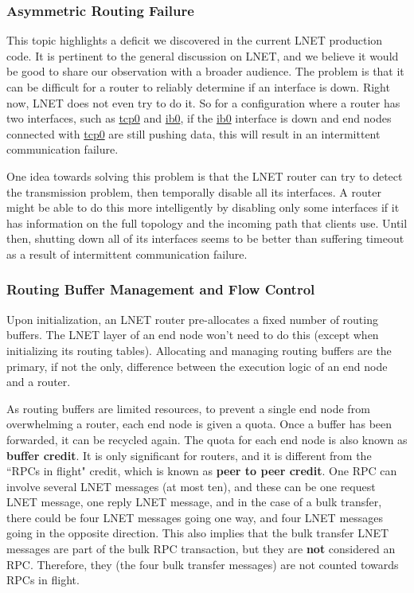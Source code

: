 \subsubsection{Asymmetric Routing Failure}

This topic highlights a deficit we discovered in the current LNET production code. It is
pertinent to the general discussion on LNET, and
we believe it would be good to share our observation with a broader audience. The problem is
that it can be difficult for a router to reliably determine if an interface is
down. Right now, LNET does not even try to do it. So for a configuration
where a router has two interfaces, such as \url{tcp0} and \url{ib0}, if the \url{ib0}
interface is down and end nodes connected with \url{tcp0} are still pushing
data, this will result in an intermittent communication failure.

One idea towards solving this problem is that the  LNET router can try to
detect the transmission problem, then temporally disable all its interfaces. A
router might be able to do this more intelligently by disabling only some
interfaces if it has information on the full topology and the incoming path
that clients use. Until then, shutting down all of its interfaces seems to be
better than suffering timeout as a result of intermittent communication
failure.

\subsubsection{Routing Buffer Management and Flow Control}

Upon initialization, an LNET router pre-allocates a fixed number of routing
buffers. The LNET layer of an end node won't need to do this (except when
initializing its routing tables). Allocating and managing routing buffers are
the primary, if not the only, difference between the execution logic of an end
node and a router.

As routing buffers are limited resources, to prevent a single end node from
overwhelming a router, each end node is given a quota. Once a buffer has been
forwarded, it can be recycled again. The quota for each end node is also known
as \textbf{buffer credit}. It is only significant for routers, and it is
different from the ``RPCs in flight" credit, which is known as \textbf{peer to
peer credit}. One RPC can involve several LNET messages (at most ten), and these
can be one request LNET message, one reply LNET message, and in the case of a
bulk transfer, there could be four LNET messages going one way, and four LNET
messages going in the opposite direction. This also implies that the bulk
transfer LNET messages are part of the bulk RPC transaction, but they are
\textbf{not} considered an RPC. Therefore, they (the four bulk transfer messages)
are not counted towards RPCs in flight.

